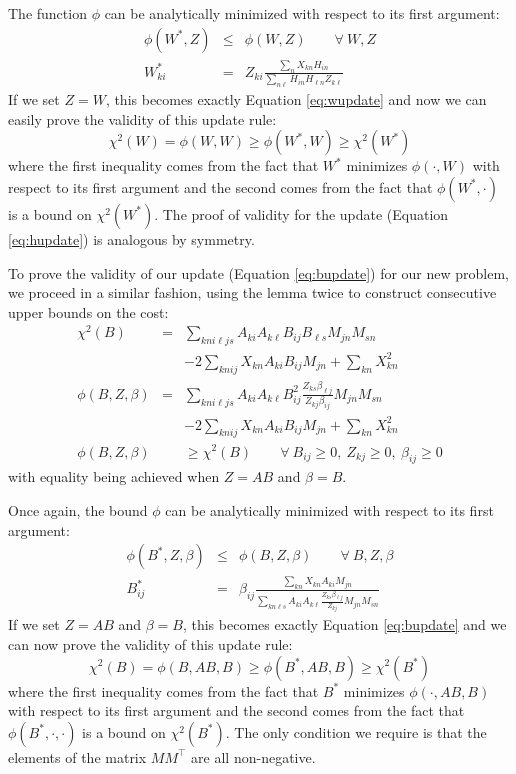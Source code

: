 \documentclass[10pt,preprint]{aastex}
\newcommand{\T}{^{\scriptscriptstyle \top}}
\newcommand{\Xkn}{X_{kn}}
\renewcommand{\AA}{A}
\newcommand{\WW}{W}
\newcommand{\Wki}{W_{ki}}
\newcommand{\Hin}{H_{in}}
\newcommand{\Hln}{H_{\ell{}n}}
\newcommand{\BB}{B}
\newcommand{\MM}{M}
\newcommand{\Aki}{A_{ki}}
\newcommand{\Akl}{A_{k\ell}}
\newcommand{\Bij}{B_{ij}}
\newcommand{\Bls}{B_{\ell{}s}}
\newcommand{\Mjn}{M_{jn}}
\newcommand{\Msn}{M_{sn}}
\newcommand{\ZZ}{Z}
\newcommand{\Zki}{Z_{ki}}
\newcommand{\Zkl}{Z_{k\ell}}
\newcommand{\Zkj}{Z_{kj}}
\newcommand{\Zks}{Z_{ks}}
\newcommand{\betaij}{\beta_{ij}}
\newcommand{\betalj}{\beta_{\ell{}j}}
\begin{document}
The function $\phi$ can be analytically minimized with respect to
its first argument:
\begin{eqnarray}
\phi(\WW^*,\ZZ) &\leq& \phi(\WW,\ZZ) \qquad \forall \: \WW,\ZZ \\
\Wki^* &=& \Zki \frac{\sum_n \Xkn \Hin}{\sum_{n\ell} \Hin\Hln \Zkl}
\end{eqnarray}
If we set $\ZZ=\WW$, this becomes exactly Equation \ref{eq:wupdate} and
now we can easily prove the validity of this update rule: 
\begin{equation}
\chi^2(\WW) = \phi(\WW,\WW) \geq \phi(\WW^*,\WW) \geq \chi^2(\WW^*)
\end{equation}
where the first inequality comes from the fact that $\WW^*$ minimizes
$\phi(\cdot,\WW)$ with respect to its first argument
and the second comes from the fact that $\phi(\WW^*,\cdot)$ is a bound
on $\chi^2(\WW^*)$. The proof of validity for the update
(Equation \ref{eq:hupdate}) is analogous by symmetry. 

To prove the validity of our update (Equation \ref{eq:bupdate}) for
our new problem, we proceed in a similar fashion, using the lemma
twice to construct consecutive upper bounds on the cost: {\small
\begin{eqnarray} 
\chi^2(\BB) &=& \sum_{kni\ell{}js} \Aki\Akl\Bij\Bls\Mjn\Msn\\ \nonumber
&&- 2 \sum_{knij} \Xkn\Aki\Bij\Mjn + \sum_{kn} \Xkn^2 \\
\phi(\BB,\ZZ,\beta) &=& \sum_{kni\ell{}js} \Aki\Akl\Bij^2
\frac{\Zks\betalj}{\Zkj\betaij}\Mjn\Msn\\ \nonumber
&&- 2 \sum_{knij} \Xkn\Aki\Bij\Mjn + \sum_{kn} \Xkn^2 \\
\phi(\BB,\ZZ,\beta) &&\geq \chi^2(\BB) \qquad \forall 
\: \Bij\geq 0,\: \Zkj\geq 0,\: \betaij\geq 0
\end{eqnarray}
} with equality being achieved when $\ZZ=\AA\BB$ and 
$\beta=\BB$.

Once again, the bound $\phi$ can be analytically minimized with respect to
its first argument:
\begin{eqnarray}
\phi(\BB^*,\ZZ,\beta) &\leq& \phi(\BB,\ZZ,\beta) \qquad 
\forall \: \BB,\ZZ,\beta \\
\Bij^* &=& \betaij \frac{\sum_{kn} \Xkn\Aki\Mjn}
{\sum_{kn\ell{}s} \Aki\Akl\frac{\Zks\betalj}{\Zkj}\Mjn\Msn}
\end{eqnarray}
If we set $\ZZ=\AA\BB$ and $\beta=\BB$, this becomes
exactly Equation \ref{eq:bupdate} and 
we can now prove the validity of this update rule: 
\begin{equation}
\chi^2(\BB) = \phi(\BB,\AA\BB,\BB) \geq \phi(\BB^*,\AA\BB,\BB) 
\geq \chi^2(\BB^*) 
\end{equation}
where the first inequality comes from the fact that $\BB^*$ minimizes
$\phi(\cdot,\AA\BB,\BB)$ with respect to its first argument
and the second comes from the fact that $\phi(\BB^*,\cdot,\cdot)$ is a bound
on $\chi^2(\BB^*)$. The only condition we require is that the elements
of the matrix $\MM\MM\T$ are all non-negative.
\end{document}
